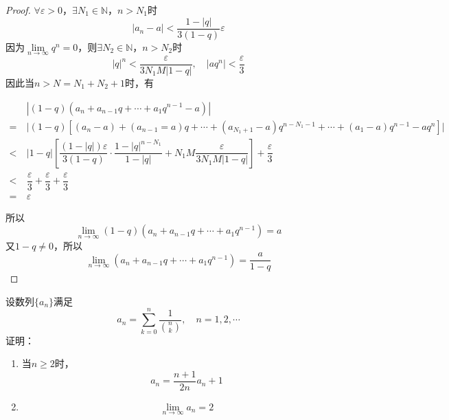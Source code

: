 \begin{proof}

    $\forall \varepsilon > 0$，$\exists N_1 \in \mathbb{N}$，$n > N_1$时
    $$|a_n - a| < \dfrac{1 - |q|}{3(1 - q)}\varepsilon$$
    因为$\lim\limits_{n\to\infty}{q^n} = 0$，则$\exists N_2 \in \mathbb{N}$，$n > N_2$时
    $$|q|^n < \dfrac{\varepsilon}{3N_1M|1-q|}, \quad |aq^n| < \dfrac{\varepsilon}{3}$$
    因此当$n > N = N_1 + N_2 + 1$时，有

    \begin{align*}
        & |(1 - q)(a_n + a_{n-1}q + \cdots + a_1q^{n-1} - a)| \\
        = \ & \big|(1 - q)[(a_n - a) + (a_{n-1} = a)q + \cdots + (a_{N_1+1} - a)q^{n - N_1 - 1} + \cdots + (a_1 - a)q^{n-1} - aq^n] \big| \\
        < \ & |1 - q| \left[ \dfrac{(1 - |q|)\varepsilon}{3(1 - q)} \cdot \dfrac{1 - |q|^{n - N_1}}{1 - |q|} + N_1M \dfrac{\varepsilon}{3N_1M|1 - q|} \right] + \dfrac{\varepsilon}{3} \\
        < \ & \dfrac{\varepsilon}{3} + \dfrac{\varepsilon}{3} + \dfrac{\varepsilon}{3} \\
        = \ & \varepsilon 
    \end{align*}

    所以
    $$\lim_{n\to\infty}{(1 - q)(a_n + a_{n-1}q + \cdots + a_1q^{n-1})} = a$$
    又$1 - q \neq 0$，所以
    $$\lim_{n\to\infty}{(a_n + a_{n-1}q + \cdots + a_1q^{n-1})} = \dfrac{a}{1 - q}$$

\end{proof}

\begin{proposition}

    设数列$\{a_n\}$满足
    $$a_n = \sum_{k=0}^{n}{\dfrac{1}{\binom{n}{k}}}, \quad n = 1,2,\cdots$$
    证明：
    
    \begin{enumerate}

        \item 
            当$n \geq 2$时，
            $$a_n = \dfrac{n+1}{2n}a_n + 1$$
        
        \item 
            $$\lim_{n\to\infty}{a_n} = 2$$
        
    \end{enumerate}

\end{proposition}


